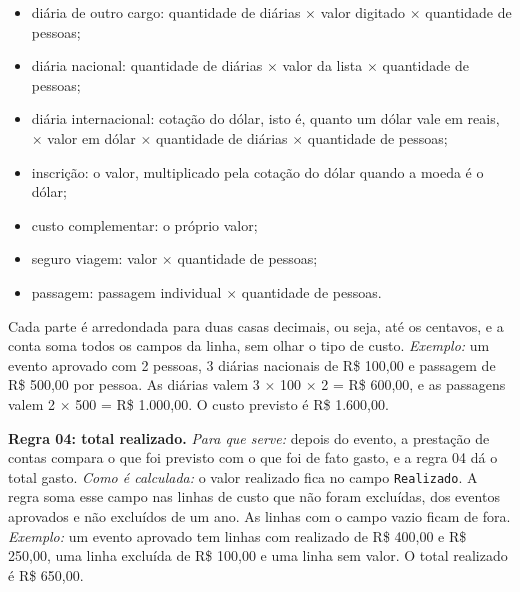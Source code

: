 \begin{itemize}
    \item diária de outro cargo: quantidade de diárias $\times$ valor digitado $\times$ quantidade de pessoas;
    \item diária nacional: quantidade de diárias $\times$ valor da lista $\times$ quantidade de pessoas;
    \item diária internacional: cotação do dólar, isto é, quanto um dólar vale em reais, $\times$ valor em dólar $\times$ quantidade de diárias $\times$ quantidade de pessoas;
    \item inscrição: o valor, multiplicado pela cotação do dólar quando a moeda é o dólar;
    \item custo complementar: o próprio valor;
    \item seguro viagem: valor $\times$ quantidade de pessoas;
    \item passagem: passagem individual $\times$ quantidade de pessoas.
\end{itemize}

Cada parte é arredondada para duas casas decimais, ou seja, até os centavos, e a conta soma todos os campos da linha, sem olhar o tipo de custo. \textit{Exemplo:} um evento aprovado com 2 pessoas, 3 diárias nacionais de R\$ 100,00 e passagem de R\$ 500,00 por pessoa. As diárias valem 3 $\times$ 100 $\times$ 2 = R\$ 600,00, e as passagens valem 2 $\times$ 500 = R\$ 1.000,00. O custo previsto é R\$ 1.600,00.

\textbf{Regra 04: total realizado.} \textit{Para que serve:} depois do evento, a prestação de contas compara o que foi previsto com o que foi de fato gasto, e a regra 04 dá o total gasto. \textit{Como é calculada:} o valor realizado fica no campo \texttt{Realizado}. A regra soma esse campo nas linhas de custo que não foram excluídas, dos eventos aprovados e não excluídos de um ano. As linhas com o campo vazio ficam de fora. \textit{Exemplo:} um evento aprovado tem linhas com realizado de R\$ 400,00 e R\$ 250,00, uma linha excluída de R\$ 100,00 e uma linha sem valor. O total realizado é R\$ 650,00.
